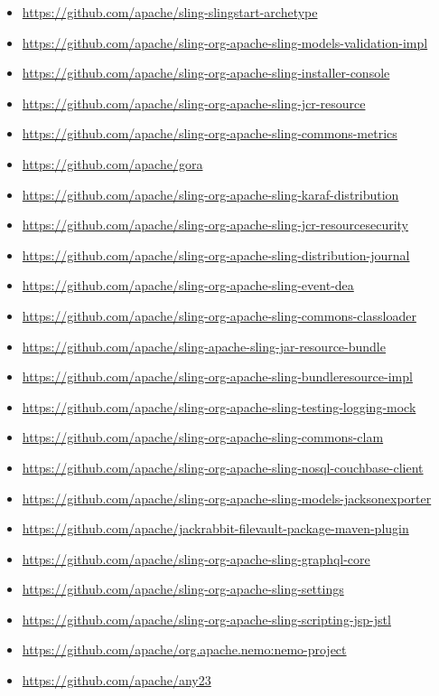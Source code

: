 \documentclass[sigconf]{acmart}
\begin{document}
\begin{itemize}
  \item \url{https://github.com/apache/sling-slingstart-archetype}
  \item \url{https://github.com/apache/sling-org-apache-sling-models-validation-impl}
  \item \url{https://github.com/apache/sling-org-apache-sling-installer-console}
  \item \url{https://github.com/apache/sling-org-apache-sling-jcr-resource}
  \item \url{https://github.com/apache/sling-org-apache-sling-commons-metrics}
  \item \url{https://github.com/apache/gora}
  \item \url{https://github.com/apache/sling-org-apache-sling-karaf-distribution}
  \item \url{https://github.com/apache/sling-org-apache-sling-jcr-resourcesecurity}
  \item \url{https://github.com/apache/sling-org-apache-sling-distribution-journal}
  \item \url{https://github.com/apache/sling-org-apache-sling-event-dea}
  \item \url{https://github.com/apache/sling-org-apache-sling-commons-classloader}
  \item \url{https://github.com/apache/sling-apache-sling-jar-resource-bundle}
  \item \url{https://github.com/apache/sling-org-apache-sling-bundleresource-impl}
  \item \url{https://github.com/apache/sling-org-apache-sling-testing-logging-mock}
  \item \url{https://github.com/apache/sling-org-apache-sling-commons-clam}
  \item \url{https://github.com/apache/sling-org-apache-sling-nosql-couchbase-client}
  \item \url{https://github.com/apache/sling-org-apache-sling-models-jacksonexporter}
  \item \url{https://github.com/apache/jackrabbit-filevault-package-maven-plugin}
  \item \url{https://github.com/apache/sling-org-apache-sling-graphql-core}
  \item \url{https://github.com/apache/sling-org-apache-sling-settings}
  \item \url{https://github.com/apache/sling-org-apache-sling-scripting-jsp-jstl}
  \item \url{https://github.com/apache/org.apache.nemo:nemo-project}
  \item \url{https://github.com/apache/any23}

\end{itemize}
\end{document}
